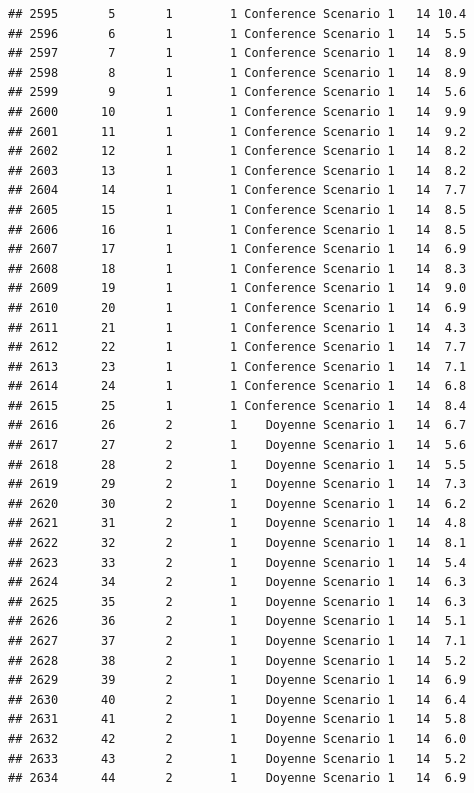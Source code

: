 \documentclass[
]{article}
\begin{document}
\begin{verbatim}
## 2595       5       1        1 Conference Scenario 1   14 10.4
## 2596       6       1        1 Conference Scenario 1   14  5.5
## 2597       7       1        1 Conference Scenario 1   14  8.9
## 2598       8       1        1 Conference Scenario 1   14  8.9
## 2599       9       1        1 Conference Scenario 1   14  5.6
## 2600      10       1        1 Conference Scenario 1   14  9.9
## 2601      11       1        1 Conference Scenario 1   14  9.2
## 2602      12       1        1 Conference Scenario 1   14  8.2
## 2603      13       1        1 Conference Scenario 1   14  8.2
## 2604      14       1        1 Conference Scenario 1   14  7.7
## 2605      15       1        1 Conference Scenario 1   14  8.5
## 2606      16       1        1 Conference Scenario 1   14  8.5
## 2607      17       1        1 Conference Scenario 1   14  6.9
## 2608      18       1        1 Conference Scenario 1   14  8.3
## 2609      19       1        1 Conference Scenario 1   14  9.0
## 2610      20       1        1 Conference Scenario 1   14  6.9
## 2611      21       1        1 Conference Scenario 1   14  4.3
## 2612      22       1        1 Conference Scenario 1   14  7.7
## 2613      23       1        1 Conference Scenario 1   14  7.1
## 2614      24       1        1 Conference Scenario 1   14  6.8
## 2615      25       1        1 Conference Scenario 1   14  8.4
## 2616      26       2        1    Doyenne Scenario 1   14  6.7
## 2617      27       2        1    Doyenne Scenario 1   14  5.6
## 2618      28       2        1    Doyenne Scenario 1   14  5.5
## 2619      29       2        1    Doyenne Scenario 1   14  7.3
## 2620      30       2        1    Doyenne Scenario 1   14  6.2
## 2621      31       2        1    Doyenne Scenario 1   14  4.8
## 2622      32       2        1    Doyenne Scenario 1   14  8.1
## 2623      33       2        1    Doyenne Scenario 1   14  5.4
## 2624      34       2        1    Doyenne Scenario 1   14  6.3
## 2625      35       2        1    Doyenne Scenario 1   14  6.3
## 2626      36       2        1    Doyenne Scenario 1   14  5.1
## 2627      37       2        1    Doyenne Scenario 1   14  7.1
## 2628      38       2        1    Doyenne Scenario 1   14  5.2
## 2629      39       2        1    Doyenne Scenario 1   14  6.9
## 2630      40       2        1    Doyenne Scenario 1   14  6.4
## 2631      41       2        1    Doyenne Scenario 1   14  5.8
## 2632      42       2        1    Doyenne Scenario 1   14  6.0
## 2633      43       2        1    Doyenne Scenario 1   14  5.2
## 2634      44       2        1    Doyenne Scenario 1   14  6.9

\end{verbatim}
\end{document}

